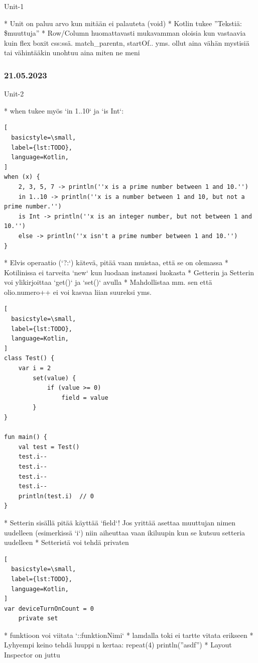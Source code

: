 Unit-1

* Unit on paluu arvo kun mitään ei palauteta (void)
* Kotlin tukee ''Tekstiä: \$muuttuja''
* Row/Column huomattavasti mukavamman oloisia kun vastaavia kuin flex boxit css:ssä. match\_parentn, startOf.. yms. ollut aina vähän mystisiä tai vähintääkin unohtuu aina miten ne meni

\subsubsection{21.05.2023}

Unit-2

* when tukee myös `in 1..10` ja `is Int`:

\begin{lstlisting}[
  basicstyle=\small,
  label={lst:TODO},
  language=Kotlin,
]
when (x) {
    2, 3, 5, 7 -> println(''x is a prime number between 1 and 10.'')
    in 1..10 -> println(''x is a number between 1 and 10, but not a prime number.'')
    is Int -> println(''x is an integer number, but not between 1 and 10.'')
    else -> println(''x isn't a prime number between 1 and 10.'')
}
\end{lstlisting}

* Elvis operaatio (`?:`) kätevä, pitää vaan muistaa, että se on olemassa
* Kotilinissa ei tarveita `new` kun luodaan instanssi luokasta
* Getterin ja Setterin voi ylikirjoittaa `get()` ja `set()` avulla
  * Mahdollistaa mm. sen että olio.numero++ ei voi kasvaa liian suureksi yms.

\begin{lstlisting}[
  basicstyle=\small,
  label={lst:TODO},
  language=Kotlin,
]
class Test() {
    var i = 2
        set(value) {
            if (value >= 0)
                field = value
        }
}

fun main() {
    val test = Test()
    test.i--
    test.i--
    test.i--
    test.i--
    println(test.i)  // 0
}
\end{lstlisting}

* Setterin sisällä pitää käyttää `field`! Jos yrittää asettaa muuttujan nimen uudelleen (esimerkissä `i`) niin aiheuttaa vaan ikiluupin kun se kutsuu setteria uudelleen
* Setteristä voi tehdä privaten

\begin{lstlisting}[
  basicstyle=\small,
  label={lst:TODO},
  language=Kotlin,
]
var deviceTurnOnCount = 0
    private set
\end{lstlisting}

* funktioon voi viitata `::funktionNimi`
* lamdalla toki ei tartte vitata erikseen
* Lyhyempi keino tehdä luuppi n kertaa: repeat(4) { println(''asdf'') }
* Layout Inspector on juttu

